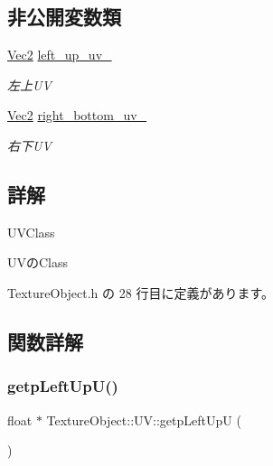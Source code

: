 \subsection*{非公開変数類}
\begin{DoxyCompactItemize}
\item 
\mbox{\hyperlink{_vector3_d_8h_a5ef6e95dfc5f9d3820b71772d99bbc25}{Vec2}} \mbox{\hyperlink{class_texture_object_1_1_u_v_aa1db937c69b68f578130bd03954d1d3f}{left\+\_\+up\+\_\+uv\+\_\+}}
\begin{DoxyCompactList}\small\item\em 左上\+UV \end{DoxyCompactList}\item 
\mbox{\hyperlink{_vector3_d_8h_a5ef6e95dfc5f9d3820b71772d99bbc25}{Vec2}} \mbox{\hyperlink{class_texture_object_1_1_u_v_a844cecfef539629da041254803f54795}{right\+\_\+bottom\+\_\+uv\+\_\+}}
\begin{DoxyCompactList}\small\item\em 右下\+UV \end{DoxyCompactList}\end{DoxyCompactItemize}


\subsection{詳解}
U\+V\+Class 

U\+Vの\+Class 

 Texture\+Object.\+h の 28 行目に定義があります。



\subsection{関数詳解}
\mbox{\label{class_texture_object_1_1_u_v_aba8a4353d85b8e17896c2b477d0bef0b}} 
\subsubsection{\texorpdfstring{getp\+Left\+Up\+U()}{getpLeftUpU()}}
{\footnotesize\ttfamily float $\ast$ Texture\+Object\+::\+U\+V\+::getp\+Left\+UpU (\begin{DoxyParamCaption}{ }\end{DoxyParamCaption})}



